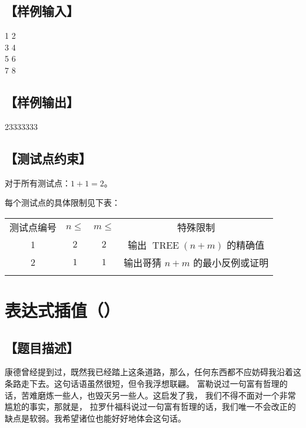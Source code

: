 \documentclass{statement}
\begin{document}
    \subsection[样例输入]{【样例输入】}
    \begin{example}
1 2\\
3 4\\
5 6\\
7 8
    \end{example}

    \subsection[样例输出]{【样例输出】}
    \begin{example}
23333333
    \end{example}

    \subsection[测试点约束]{【测试点约束】}
    对于所有测试点：$1+1=2$。

    每个测试点的具体限制见下表：
    \begin{center}
        \begin{tabular}{c|c|c|c}
            \Xhline{5\arrayrulewidth}
            测试点编号 & $n\leq$ & $m\leq$ & 特殊限制\\
            \Xhline{3\arrayrulewidth}
            1 & $2$ & $2$ & 输出 $\operatorname{TREE}(n+m)$ 的精确值\\
            \hline
            2 & $1$ & $1$ & 输出哥猜 $n+m$ 的最小反例或证明\\
            \Xhline{5\arrayrulewidth}
        \end{tabular}
    \end{center}



    \newpage
    \section{表达式插值（）}
    \subsection[题目描述]{【题目描述】}

    康德曾经提到过，既然我已经踏上这条道路，那么，任何东西都不应妨碍我沿着这条路走下去。这句话语虽然很短，但令我浮想联翩。 富勒说过一句富有哲理的话，苦难磨炼一些人，也毁灭另一些人。这启发了我， 我们不得不面对一个非常尴尬的事实，那就是， 拉罗什福科说过一句富有哲理的话，我们唯一不会改正的缺点是软弱。我希望诸位也能好好地体会这句话。 
    
\end{document}
